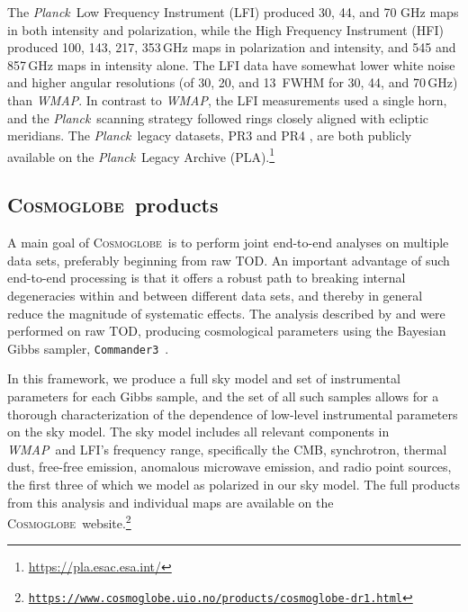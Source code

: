 \documentclass[twocolumn]{../../common/aa}
\def\WMAP{\emph{WMAP}}
\def\Planck{\emph{Planck}}
\def\commanderthree{\texttt{Commander3}}
\newcommand{\cosmoglobe}{\textsc{Cosmoglobe}}
\newcommand{\Cosmoglobe}{\textsc{Cosmoglobe}}
\begin{document}
The \Planck\ Low Frequency Instrument (LFI) produced  30, 44, and 70 GHz maps in both intensity and polarization, while the High Frequency Instrument (HFI) produced 100, 143, 217, 353\,GHz maps in polarization and intensity, and 545 and 857\,GHz maps in intensity alone. The LFI data have somewhat lower white noise and higher angular resolutions (of 30\arcm, 20\arcm, and 13\arcm\ FWHM for 30, 44, and 70\,GHz) than \WMAP. In contrast to \WMAP, the LFI measurements used a single horn, and the \Planck\ scanning strategy followed rings closely aligned with ecliptic meridians. The \Planck\ legacy datasets, PR3 \citep{planck2016-l01} and PR4 \citep{planck2020-LVII}, are both publicly available on the \Planck\ Legacy Archive (PLA).\footnote{\url{https://pla.esac.esa.int/}}

\subsection{\Cosmoglobe\ products}
\label{sec:cosmoglobe_data}

A main goal of \Cosmoglobe\ is to perform joint end-to-end analyses on multiple data sets, preferably beginning from raw TOD. An important advantage of such end-to-end processing is that it offers a robust path to breaking internal degeneracies within and between different data sets, and thereby in general reduce the magnitude of systematic effects. The analysis described by \citet{bp01} and \citet{watts2023_dr1} were performed on raw TOD, producing cosmological parameters using the Bayesian Gibbs sampler, \commanderthree\ \citep{bp03}. %

In this framework, we produce a full sky model and set of instrumental parameters for each Gibbs sample, and the set of all such samples allows for a thorough characterization of the dependence of low-level instrumental parameters on the sky model. The sky model includes all relevant components in \WMAP\ and LFI's frequency range, specifically the CMB, synchrotron, thermal dust, free-free emission, anomalous microwave emission, and radio point sources, the first three of which we model as polarized in our sky model. The full products from this analysis and individual maps are available on the \cosmoglobe\ website.\footnote{\href{https://www.cosmoglobe.uio.no/products/cosmoglobe-dr1.html}{\texttt{https://www.cosmoglobe.uio.no/products/\newline cosmoglobe-dr1.html}}}
\end{document}
